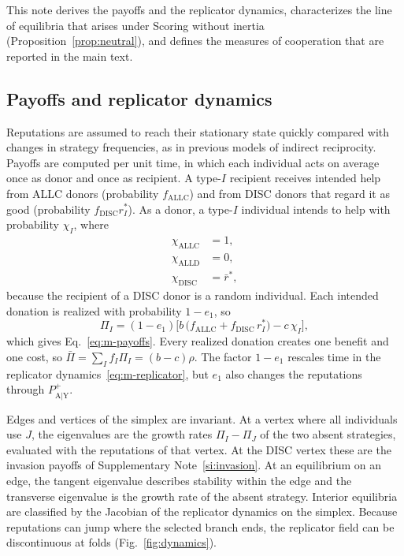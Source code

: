 \documentclass[10pt]{wlscirep}
\newcommand{\Pp}[1]{P^{+}_{\mathrm{#1}}}   %
\newcommand{\ALLC}{\mathrm{ALLC}}
\newcommand{\ALLD}{\mathrm{ALLD}}
\newcommand{\DISC}{\mathrm{DISC}}
\theoremstyle{plain}
\theoremstyle{remark}
\begin{document}
This note derives the payoffs and the replicator dynamics, characterizes the line of equilibria that arises under Scoring without inertia (Proposition~\ref{prop:neutral}), and defines the measures of cooperation that are reported in the main text.

\subsection{Payoffs and replicator dynamics}

Reputations are assumed to reach their stationary state quickly compared with changes in strategy frequencies, as in previous models of indirect reciprocity. Payoffs are computed per unit time, in which each individual acts on average once as donor and once as recipient. A type-$I$ recipient receives intended help from ALLC donors (probability $f_{\ALLC}$) and from DISC donors that regard it as good (probability $f_{\DISC}r^*_I$). As a donor, a type-$I$ individual intends to help with probability $\chi_I$, where
\begin{equation}
\begin{aligned}
\chi_{\ALLC}&=1,\\
\chi_{\ALLD}&=0,\\
\chi_{\DISC}&=\bar r^*,
\end{aligned}
\label{eq:s-chi}
\end{equation}
because the recipient of a DISC donor is a random individual. Each intended donation is realized with probability $1-e_1$, so
\begin{equation}
\Pi_I=(1-e_1)\bigl[b\,\bigl(f_{\ALLC}+f_{\DISC}\,r^*_I\bigr)-c\,\chi_I\bigr],
\label{eq:s-payoffs}
\end{equation}
which gives Eq.~\eqref{eq:m-payoffs}. Every realized donation creates one benefit and one cost, so $\bar\Pi=\sum_If_I\Pi_I=(b-c)\rho$. The factor $1-e_1$ rescales time in the replicator dynamics~\eqref{eq:m-replicator}, but $e_1$ also changes the reputations through $\Pp{A|Y}$.

Edges and vertices of the simplex are invariant. At a vertex where all individuals use $J$, the eigenvalues are the growth rates $\Pi_I-\Pi_J$ of the two absent strategies, evaluated with the reputations of that vertex. At the DISC vertex these are the invasion payoffs of Supplementary Note~\ref{si:invasion}. At an equilibrium on an edge, the tangent eigenvalue describes stability within the edge and the transverse eigenvalue is the growth rate of the absent strategy. Interior equilibria are classified by the Jacobian of the replicator dynamics on the simplex. Because reputations can jump where the selected branch ends, the replicator field can be discontinuous at folds (Fig.~\ref{fig:dynamics}).
\end{document}
